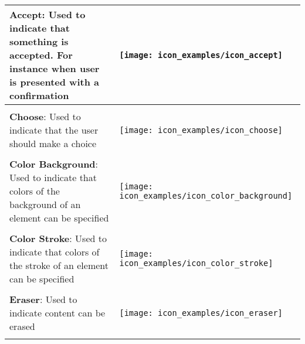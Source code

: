 \begin{longtable}{m{\textwidth-2.2cm} m{1.5cm}}
	\textbf{Accept}: Used to indicate that something is accepted. For instance when user is presented with a confirmation & \parbox[c]{1.2cm}{
	\texttt{[image: icon\_examples/icon\_accept]}} \\[0.6cm] \hline \\[-0.6em]

	\textbf{Choose}: Used to indicate that the user should make a choice & \parbox[c]{1.2cm}{
	\texttt{[image: icon\_examples/icon\_choose]}} \\[0.6cm] \hline \\[-0.6em]

	\textbf{Color Background}: Used to indicate that colors of the background of an element can be specified & \parbox[c]{1.2cm}{
	\texttt{[image: icon\_examples/icon\_color\_background]}} \\[0.6cm] \hline \\[-0.6em]

	\textbf{Color Stroke}: Used to indicate that colors of the stroke of an element can be specified & \parbox[c]{1.2cm}{
	\texttt{[image: icon\_examples/icon\_color\_stroke]}} \\[0.6cm] \hline \\[-0.6em]

	\textbf{Eraser}: Used to indicate content can be erased & \parbox[c]{1.2cm}{
	\texttt{[image: icon\_examples/icon\_eraser]}} \\[0.6cm] \hline \\[-0.6em]
\end{longtable}